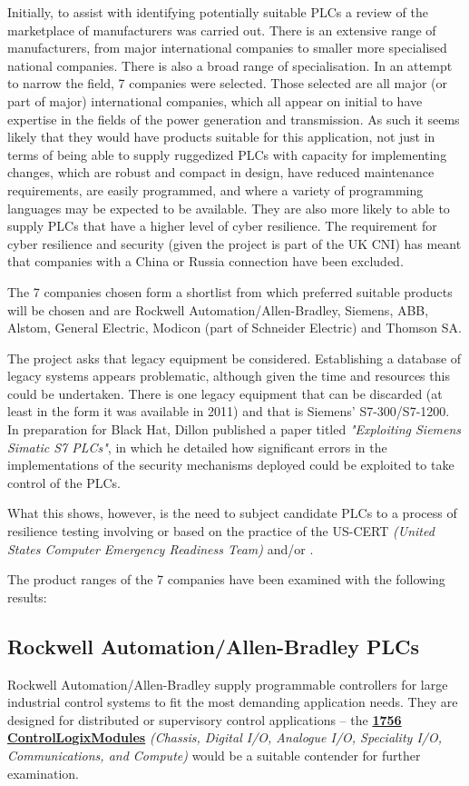 \documentclass[12pt]{article}
\begin{document}
Initially, to assist with identifying potentially suitable PLCs a review of the marketplace of manufacturers was carried out. There is an extensive range of manufacturers, from major international companies to smaller more specialised national companies. There is also a broad range of specialisation. In an attempt to narrow the field, 7 companies were selected. Those selected are all major (or part of major) international companies, which all appear on initial to have expertise in the fields of the power generation and transmission. As such it seems likely that they would have products suitable for this application, not just in terms of being able to supply ruggedized PLCs with capacity for implementing changes, which are robust and compact in design, have reduced maintenance requirements, are easily programmed, and where a variety of programming languages may be expected to be available. They are also more likely to able to supply PLCs that have a higher level of cyber resilience. The requirement for cyber resilience and security (given the project is part of the UK CNI) has meant that companies with a China or Russia connection have been excluded.

The 7 companies chosen form a shortlist from which preferred suitable products will be chosen and are Rockwell Automation/Allen-Bradley, Siemens, ABB, Alstom, General Electric, Modicon (part of Schneider Electric) and Thomson SA.

The project asks that legacy equipment be considered. Establishing a database of legacy systems appears problematic, although given the time and resources this could be undertaken. There is one legacy equipment that can be discarded (at least in the form it was available in 2011) and that is Siemens' S7-300/S7-1200. In preparation for Black Hat, Dillon \citet{pdf:blackhat:siemensscada:20110711} published a paper titled \textit{"Exploiting Siemens Simatic S7 PLCs"}, in which he detailed how significant errors in the implementations of the security mechanisms deployed could be exploited to take control of the PLCs.

What this shows, however, is the need to subject candidate PLCs to a process of resilience testing involving or based on the practice of the US-CERT \textit{(United States Computer Emergency Readiness Team)} and/or \citet{site:ics-cert:standards:20180427}.

The product ranges of the 7 companies have been examined with the following results:
\subsection{Rockwell Automation/Allen-Bradley PLCs}
Rockwell Automation/Allen-Bradley supply programmable controllers for large industrial control systems to fit the most demanding application needs. They are designed for distributed or supervisory control applications -- the \href{https://ab.rockwellautomation.com/IO/Chassis-Based/1756-ControlLogix-IO}{\textbf{1756 ControlLogix\textregistered Modules}} \textit{(Chassis, Digital I/O, Analogue I/O, Speciality I/O, Communications, and Compute)} would be a suitable contender for further examination.
\end{document}

